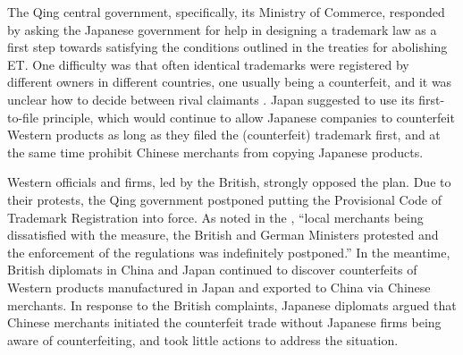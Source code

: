 \documentclass[12pt]{article}
\begin{document}
\begin{CJK*}{UTF8}{gbsn}
The Qing central government, specifically, its Ministry of Commerce, responded by asking the Japanese government for help in designing a trademark law as a first step towards satisfying the conditions outlined in the treaties for abolishing ET. One difficulty was that often identical trademarks were registered by different owners in different countries, one usually being a counterfeit, and it was unclear how to decide between rival claimants \citep{Morse1918}. Japan suggested to use its first-to-file principle, which would continue to allow Japanese companies to counterfeit Western products as long as they filed the (counterfeit) trademark first, and at the same time prohibit Chinese merchants from copying Japanese products.  %
\end{CJK*}

Western officials and firms, led by the British, strongly opposed the plan. Due to their protests, the Qing government postponed putting the Provisional Code of Trademark Registration into force. As noted in the \cite{PatentTrademarkReview1904}, ``local merchants being dissatisfied with the measure, the British and German Ministers protested and the enforcement of the regulations was indefinitely postponed.'' In the meantime, British diplomats in China and Japan continued to discover counterfeits of Western products manufactured in Japan and exported to China via Chinese merchants. In response to the British complaints, Japanese diplomats argued that Chinese merchants initiated the counterfeit trade without Japanese firms being aware of counterfeiting, and took little actions to address the situation.
\end{document}
